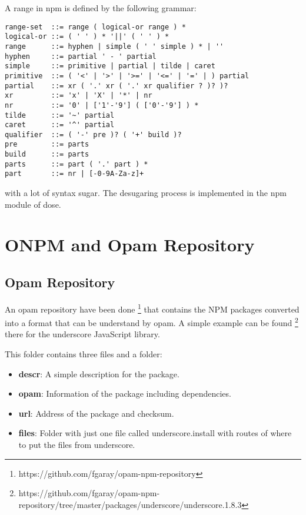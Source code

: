 \documentclass[letterpaper,12pt]{report}
\begin{document}
A range in npm is defined by the following grammar:

\begin{verbatim}
range-set  ::= range ( logical-or range ) *
logical-or ::= ( ' ' ) * '||' ( ' ' ) *
range      ::= hyphen | simple ( ' ' simple ) * | ''
hyphen     ::= partial ' - ' partial
simple     ::= primitive | partial | tilde | caret
primitive  ::= ( '<' | '>' | '>=' | '<=' | '=' | ) partial
partial    ::= xr ( '.' xr ( '.' xr qualifier ? )? )?
xr         ::= 'x' | 'X' | '*' | nr
nr         ::= '0' | ['1'-'9'] ( ['0'-'9'] ) *
tilde      ::= '~' partial
caret      ::= '^' partial
qualifier  ::= ( '-' pre )? ( '+' build )?
pre        ::= parts
build      ::= parts
parts      ::= part ( '.' part ) *
part       ::= nr | [-0-9A-Za-z]+
\end{verbatim}

with a lot of syntax sugar. The desugaring process is implemented in the npm
module of dose.




\section{ONPM and Opam Repository}

\subsection{Opam Repository}

An opam repository have been done
\footnote{https://github.com/fgaray/opam-npm-repository} that contains the NPM
packages converted into a format that can be understand by opam. A simple
example can be found \footnote{https://github.com/fgaray/opam-npm-repository/tree/master/packages/underscore/underscore.1.8.3}
there for the underscore JavaScript library.

This folder contains three files and a folder:

\begin{itemize}
  \item \textbf{descr}: A simple description for the package.
  \item \textbf{opam}: Information of the package including dependencies.
  \item \textbf{url}: Address of the package and checksum.
  \item \textbf{files}: Folder with just one file called underscore.install with
    routes of where to put the files from underscore.
\end{itemize}
\end{document}
